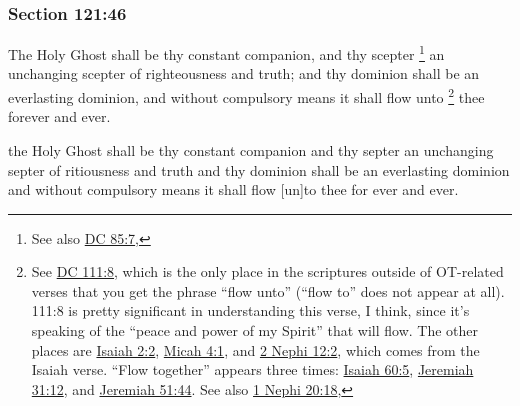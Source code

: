 	\subsubsection{Section 121:46} %
		\label{DC121-46}
		
		The Holy Ghost shall be thy constant companion, and thy scepter%
			\footnote{%
				
				
				See also \hyperref[DC85-7]{DC 85:7}, 
				}
		an unchanging scepter of righteousness and truth; and thy dominion shall be an everlasting dominion, and without compulsory means it shall flow unto%
			\footnote{%
				See \hyperref[DC111-8]{DC 111:8}, which is the only place in the scriptures outside of OT-related verses that you get the phrase ``flow unto'' (``flow to'' does not appear at all). 111:8 is pretty significant in understanding this verse, I think, since it's speaking of the ``peace and power of my Spirit'' that will flow. The other places are \hyperref[ISAIAH-2-2]{Isaiah 2:2}, \hyperref[MICAH-4-1]{Micah 4:1}, and \hyperref[2NEPHI-12-2]{2 Nephi 12:2}, which comes from the Isaiah verse. ``Flow together'' appears three times: \hyperref[ISAIAH-60-5]{Isaiah 60:5}, \hyperref[JEREMIAH-31-12]{Jeremiah 31:12}, and \hyperref[JEREMIAH-51-44]{Jeremiah 51:44}. See also \hyperref[1NEPHI-20-18]{1 Nephi 20:18}, 
				}
		thee forever and ever.
		
		\begin{framed}
		\scriptsize
			\begin{compactdesc}
				\item[JSP] the Holy Ghost shall be thy constant companion and thy septer an unchanging septer of ritiousness and truth and thy dominion shall be an everlasting dominion and without compulsory means it shall flow [un]to thee for ever and ever.
			\end{compactdesc}
		\end{framed}